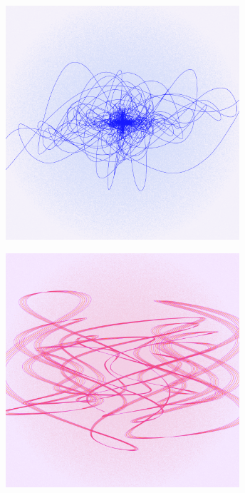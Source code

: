 \documentclass[11pt,twoside]{book}
\begin{document}
\begin{figure}[!ht]
\includegraphics[width=246pt]{azure-d38857fa-8a34-4764-ac5a-b768e03ae4c3.png}
\end{figure}
\newpage
{}
\fancyfoot[CE,CO]{\fontsize{10}{12}\selectfont \thepage}
\begin{figure}[!ht]
\includegraphics[width=246pt]{rubine-942e8ffa-2fd7-46ff-8ff9-d07be8c48ac3.png}
\end{figure}
\newpage
{}
\fancyfoot[CE,CO]{\fontsize{10}{12}\selectfont \thepage}
\end{document}
